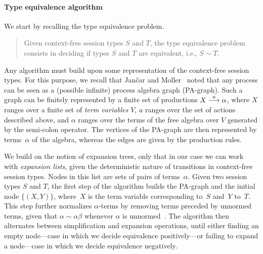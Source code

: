 \paragraph{Type equivalence algorithm}
\label{sec:algorithm}

We start by recalling the type equivalence problem.

\begin{quote}
  Given context-free session types $S$ and $T$, the type equivalence
  problem consists in deciding if types $S$ and $T$ are equivalent,
  i.e., $S\sim T$.
\end{quote}

Any algorithm must build upon some representation of the context-free
session types. For this purpose, we recall that Jan{\v{c}}ar and
Moller~\cite{janvcar1999techniques} noted that any process can be seen
as a (possible infinite) process algebra graph (PA-graph).  Such a
graph can be finitely represented by a finite set of productions
$X \stackrel{a}{\longrightarrow} \alpha$, where $X$ ranges over a finite set of
\emph{term variables} $V$, $a$ ranges over the set of actions
described above, and $\alpha$ ranges over the terms of the free
algebra over $V$ generated by the semi-colon operator.
The vertices of the PA-graph are then represented by terms~$\alpha$ of
the algebra, whereas the edges are given by the production rules.

We build on the notion of expansion trees, only that in our case we
can work with \emph{expansion lists}, given the deterministic nature
of transitions in context-free session types.
%
Nodes in this list are sets of pairs of terms~$\alpha$.
%
Given two session types $S$ and $T$, the first step of the algorithm
builds the PA-graph and the initial node $\{(X,Y)\}$, where~$X$ is the
term variable corresponding to~$S$ and~$Y$ to~$T$. This step further
normalizes $\alpha$-terms by removing terms preceded by unnormed
terms, given that $\alpha \sim \alpha\beta$ whenever $\alpha$ is
unnormed~\cite{janvcar1999techniques}.
%
The algorithm then alternates between simplification and expansion
operations, until either finding an empty node---case in which we
decide equivalence positively---or failing to expand a node---case in
which we decide equivalence negatively.


